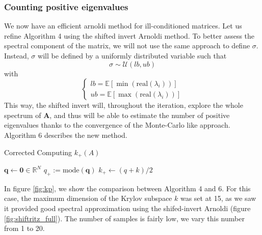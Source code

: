 \documentclass[11pt]{article}
\numberwithin{equation}{section}
\begin{document}
\subsubsection{Counting positive eigenvalues}
We now have an efficient arnoldi method for ill-conditioned matrices. Let us refine Algorithm 4 using the shifted invert Arnoldi method. To better assess the spectral component of the matrix, we will not use the same approach to define $\sigma$. Instead, $\sigma$ will be defined by a uniformly distributed variable such that $$\sigma\sim\mathcal{U}(lb,ub)$$ with 
\begin{equation*}
    \begin{cases}
        lb = \mathbb{E}\left[\min(\text{real}(\lambda_i))\right] \\
        ub = \mathbb{E}\left[\max(\text{real}(\lambda_i))\right]
    \end{cases}
\end{equation*}
This way, the shifted invert will, throughout the iteration, explore the whole spectrum of $\mathbf{A}$, and thus will be able to estimate the number of positive eigenvalues thanks to the convergence of the Monte-Carlo like approach. Algorithm 6 describes the new method.
\begin{algorithm2e}
    \SetAlgoLined
    \caption{Corrected Computing $k_{+}(A)$}
    $\mathbf{q} \gets \mathbf{0}\in\mathbb{R}^{N}$\;
    $q_+ := \text{mode}(\mathbf{q}) $\;
    $k_+\gets (q+k)/2$
\end{algorithm2e}

In figure \ref{fig:kp}, we show the comparison between Algorithm 4 and 6. For this case, the maximum dimension of the Krylov subspace $k$ was set at 15, as we saw it provided good spectral approximation using the shifed-invert Arnoldi (figure \ref{fig:shiftritz_full}). The number of samples is fairly low, we vary this number from 1 to 20. 
\end{document}
